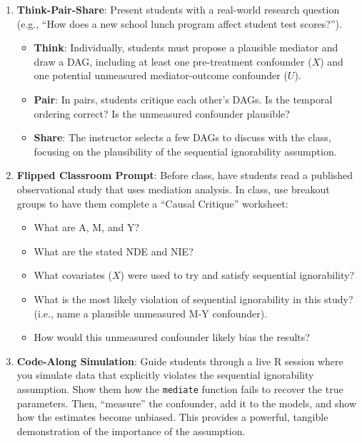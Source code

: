 \documentclass[
  10pt,
  letterpaper,
  DIV=11,
  numbers=noendperiod,
  oneside]{scrartcl}
\providecommand{\tightlist}{%
  \setlength{\itemsep}{0pt}\setlength{\parskip}{0pt}}
\begin{document}
\begin{enumerate}
\def\labelenumi{\arabic{enumi}.}
\item
  \textbf{Think-Pair-Share}: Present students with a real-world research
  question (e.g., ``How does a new school lunch program affect student
  test scores?'').

  \begin{itemize}
  \tightlist
  \item
    \textbf{Think}: Individually, students must propose a plausible
    mediator and draw a DAG, including at least one pre-treatment
    confounder (\(X\)) and one potential unmeasured mediator-outcome
    confounder (\(U\)).
  \item
    \textbf{Pair}: In pairs, students critique each other's DAGs. Is the
    temporal ordering correct? Is the unmeasured confounder plausible?
  \item
    \textbf{Share}: The instructor selects a few DAGs to discuss with
    the class, focusing on the plausibility of the sequential
    ignorability assumption.
  \end{itemize}
\item
  \textbf{Flipped Classroom Prompt}: Before class, have students read a
  published observational study that uses mediation analysis. In class,
  use breakout groups to have them complete a ``Causal Critique''
  worksheet:

  \begin{itemize}
  \tightlist
  \item
    What are A, M, and Y?
  \item
    What are the stated NDE and NIE?
  \item
    What covariates (\(X\)) were used to try and satisfy sequential
    ignorability?
  \item
    What is the most likely violation of sequential ignorability in this
    study? (i.e., name a plausible unmeasured M-Y confounder).
  \item
    How would this unmeasured confounder likely bias the results?
  \end{itemize}
\item
  \textbf{Code-Along Simulation}: Guide students through a live R
  session where you simulate data that explicitly violates the
  sequential ignorability assumption. Show them how the \texttt{mediate}
  function fails to recover the true parameters. Then, ``measure'' the
  confounder, add it to the models, and show how the estimates become
  unbiased. This provides a powerful, tangible demonstration of the
  importance of the assumption.
\end{enumerate}
\end{document}
